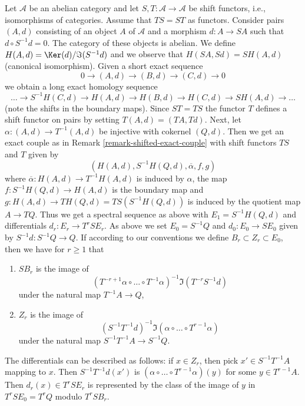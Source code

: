 \begin{remark}[Variant]
\label{remark-differential-object-selfmap}
Let $\mathcal{A}$ be an abelian category and let
$S, T : \mathcal{A} \to \mathcal{A}$ be shift functors, i.e.,
isomorphisms of categories. Assume that $TS = ST$ as functors.
Consider pairs $(A, d)$ consisting of an object $A$ of $\mathcal{A}$
and a morphism $d : A \to SA$ such that $d \circ S^{-1}d = 0$.
The category of these objects is abelian.
We define $H(A, d) = \Ker(d)/\Im(S^{-1}d)$ and we observe that
$H(SA, Sd) = SH(A, d)$ (canonical isomorphism).
Given a short exact sequence
$$
0 \to (A, d) \to (B, d) \to (C, d) \to 0
$$
we obtain a long exact homology sequence
$$
\ldots \to S^{-1}H(C, d) \to
H(A, d) \to H(B, d) \to H(C, d) \to SH(A, d) \to \ldots
$$
(note the shifts in the boundary maps). Since $ST = TS$ the functor
$T$ defines a shift functor on pairs by setting $T(A, d) = (TA, Td)$.
Next, let $\alpha : (A, d) \to T^{-1}(A, d)$ be injective with
cokernel $(Q, d)$. Then we get an exact couple as in
Remark \ref{remark-shifted-exact-couple} with shift functors $TS$ and
$T$ given by
$$
(H(A, d), S^{-1}H(Q, d), \overline{\alpha}, f, g)
$$
where $\overline{\alpha} : H(A, d) \to T^{-1}H(A, d)$ is induced by $\alpha$,
the map $f : S^{-1}H(Q, d) \to H(A, d)$ is the boundary
map and $g : H(A, d) \to TH(Q, d) = TS(S^{-1}H(Q, d))$ is induced by
the quotient map $A \to TQ$. Thus we get a spectral sequence as above
with $E_1 = S^{-1}H(Q, d)$ and differentials $d_r : E_r \to T^rSE_r$.
As above we set $E_0 = S^{-1}Q$ and $d_0 : E_0 \to SE_0$ given by
$S^{-1}d : S^{-1}Q \to Q$. If according to our conventions we define
$B_r \subset Z_r \subset E_0$, then we have for $r \geq 1$ that
\begin{enumerate}
\item $SB_r$ is the image of
$$
(T^{-r + 1}\alpha \circ \ldots \circ T^{-1}\alpha)^{-1}
\Im(T^{-r}S^{-1}d)
$$
under the natural map $T^{-1}A \to Q$,
\item $Z_r$ is the image of
$$
(S^{-1}T^{-1}d)^{-1}
\Im(\alpha \circ \ldots \circ T^{r - 1}\alpha)
$$
under the natural map $S^{-1}T^{-1}A \to S^{-1}Q$.
\end{enumerate}
The differentials can be described as follows: if $x \in Z_r$, then
pick $x' \in S^{-1}T^{-1}A$ mapping to $x$. Then $S^{-1}T^{-1}d(x')$
is $(\alpha \circ \ldots \circ T^{r - 1}\alpha)(y)$ for some
$y \in T^{r - 1}A$. Then $d_r(x) \in T^rSE_r$ is represented by the
class of the image of $y$ in $T^rSE_0 = T^rQ$ modulo $T^rSB_r$.
\end{remark}













